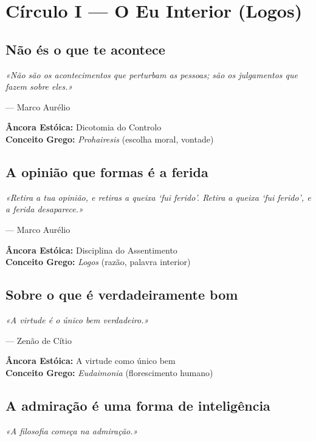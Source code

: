 \documentclass[
  11pt,
  a5paper,
]{book}
\begin{document}
\part{Círculo I --- O Eu Interior (Logos)}

\chapter{Não és o que te acontece}\label{nuxe3o-uxe9s-o-que-te-acontece}

\emph{«Não são os acontecimentos que perturbam as pessoas; são os
julgamentos que fazem sobre eles.»}

--- Marco Aurélio

\textbf{Âncora Estóica:} Dicotomia do Controlo\\
\textbf{Conceito Grego:} \emph{Prohairesis} (escolha moral, vontade)

\chapter{A opinião que formas é a
ferida}\label{a-opiniuxe3o-que-formas-uxe9-a-ferida}

\emph{«Retira a tua opinião, e retiras a queixa `fui ferido'. Retira a
queixa `fui ferido', e a ferida desaparece.»}

--- Marco Aurélio

\textbf{Âncora Estóica:} Disciplina do Assentimento\\
\textbf{Conceito Grego:} \emph{Logos} (razão, palavra interior)

\chapter{Sobre o que é verdadeiramente
bom}\label{sobre-o-que-uxe9-verdadeiramente-bom}

\emph{«A virtude é o único bem verdadeiro.»}

--- Zenão de Cítio

\textbf{Âncora Estóica:} A virtude como único bem\\
\textbf{Conceito Grego:} \emph{Eudaimonia} (florescimento humano)

\chapter{A admiração é uma forma de
inteligência}\label{a-admirauxe7uxe3o-uxe9-uma-forma-de-inteliguxeancia}

\emph{«A filosofia começa na admiração.»}
\end{document}
